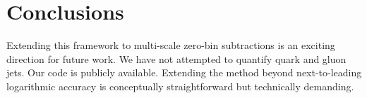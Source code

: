 \section{Conclusions}\label{sec:conclusions}

Extending this framework to multi-scale zero-bin subtractions is an
exciting direction for future work. We have not attempted to quantify
quark and gluon jets. Our code is publicly available. Extending the
method beyond next-to-leading logarithmic accuracy is conceptually
straightforward but technically demanding.

